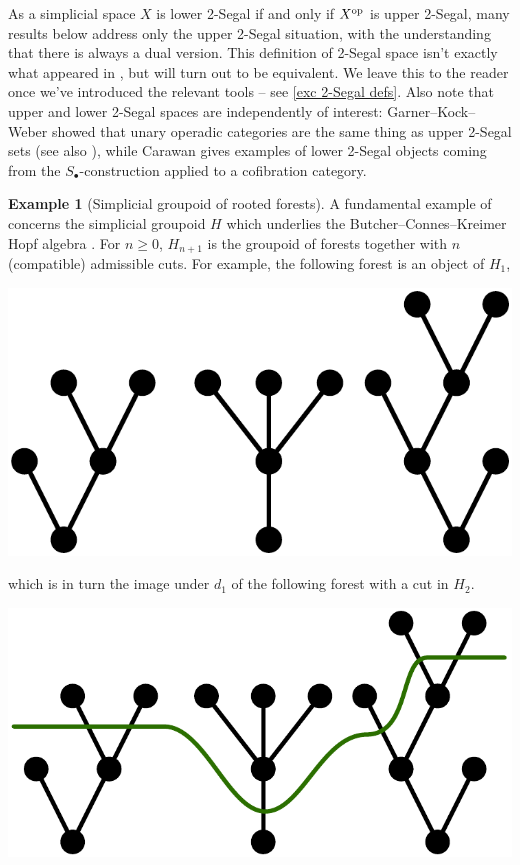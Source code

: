 \documentclass{amsart}
\theoremstyle{definition}
\newtheorem{example}[theorem]{Example}
\theoremstyle{remark}
\newcommand{\op}{\textup{op}}
\begin{document}
As a simplicial space $X$ is lower 2-Segal if and only if $X^\op$ is upper 2-Segal, many results below address only the upper 2-Segal situation, with the understanding that there is always a dual version.
This definition of 2-Segal space isn't exactly what appeared in \cite{Stern:BIRS}, but will turn out to be equivalent.
We leave this to the reader once we've introduced the relevant tools --
see \cref{exc 2-Segal defs}.
Also note that upper and lower 2-Segal spaces are independently of interest: Garner--Kock--Weber \cite{GarnerKockWeber:OCD} showed that unary operadic categories are the same thing as upper 2-Segal sets (see also \cite{Hackney:OC2SS}), while Carawan \cite{Carawan:2SMACWC} gives examples of lower 2-Segal objects coming from the $S_\bullet$-construction applied to a cofibration category.

\begin{example}[Simplicial groupoid of rooted forests]\label{ex forests}
A fundamental example of \cite{GKT1} %
concerns the simplicial groupoid $H$ which underlies the Butcher--Connes--Kreimer Hopf algebra \cite{ConnesKreimer:HARNG}.
For $n \geq 0$, $H_{n+1}$ is the groupoid of forests together with $n$ (compatible) admissible cuts.
For example, the following forest is an object of $H_1$,
\begin{center}
\includegraphics[scale=0.2]{forest_no_cut.pdf}
\end{center}
which is in turn the image under $d_1$ of the following forest with a cut in $H_2$.
\begin{center}
\includegraphics[scale=0.2]{forest_with_cut.pdf}

\end{center}
\end{example}
\end{document}
